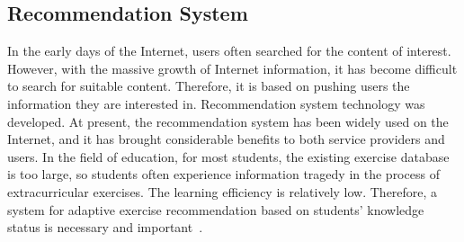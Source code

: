 \subsection{Recommendation System}


In the early days of the Internet, users often searched for the content of interest. However, with the massive growth of Internet information, it has become difficult to search for suitable content. Therefore, it is based on pushing users the information they are interested in. Recommendation system technology was developed. At present, the recommendation system has been widely used on the Internet, and it has brought considerable benefits to both service providers and users. In the field of education, for most students, the existing exercise database is too large, so students often experience information tragedy in the process of extracurricular exercises. The learning efficiency is relatively low. Therefore, a system for adaptive exercise recommendation based on students' knowledge status is necessary and important~\cite{huang2019exploring}.

